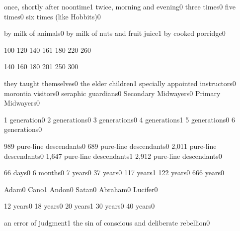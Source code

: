 {once, shortly after noontime}{1}
{twice, morning and evening}{0}
{three times}{0}
{five times}{0}
{six times (like Hobbits)}{0}
\qstop

{by milk of animals}{0}
{by milk of nuts and fruit juice}{1}
{by cooked porridge}{0}
\qstop

{10}{0}
{12}{0}
{14}{0}
{16}{1}
{18}{0}
{22}{0}
{26}{0}
\qstop

{14}{0}
{16}{0}
{18}{0}
{20}{1}
{25}{0}
{30}{0}
\qstop

{they taught themselves}{0}
{the elder children}{1}
{specially appointed instructors}{0}
{morontia visitors}{0}
{seraphic guardians}{0}
{Secondary Midwayers}{0}
{Primary Midwayers}{0}
\qstop

{1 generation}{0}
{2 generations}{0}
{3 generations}{0}
{4 generations}{1}
{5 generations}{0}
{6 generations}{0}
\qstop

{989 pure\hyp{}line descendants}{0}
{689 pure\hyp{}line descendants}{0}
{2,011 pure\hyp{}line descendants}{0}
{1,647 pure\hyp{}line descendants}{1}
{2,912 pure\hyp{}line descendants}{0}
\qstop

{66 days}{0}
{6 months}{0}
{7 years}{0}
{37 years}{0}
{117 years}{1}
{122 years}{0}
{666 years}{0}
\qstop


{Adam}{0}
{Cano}{1}
{Andon}{0}
{Satan}{0}
{Abraham}{0}
{Lucifer}{0}
\qstop

{12 years}{0}
{18 years}{0}
{20 years}{1}
{30 years}{0}
{40 years}{0}
\qstop


{an error of judgment}{1}
{the sin of conscious and deliberate rebellion}{0}
\qstop

